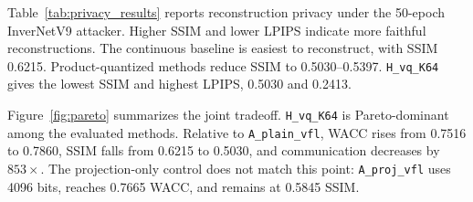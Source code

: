 \documentclass{article}
\begin{document}
Table~\ref{tab:privacy_results} reports reconstruction privacy under the 50-epoch InverNetV9 attacker. Higher SSIM and lower LPIPS indicate more faithful reconstructions. The continuous baseline is easiest to reconstruct, with SSIM 0.6215. Product-quantized methods reduce SSIM to 0.5030--0.5397. \texttt{H\_vq\_K64} gives the lowest SSIM and highest LPIPS, 0.5030 and 0.2413.

\begin{table}[t]
\caption{Reconstruction privacy results under InverNetV9. SSIM and LPIPS are averaged over two seeds and all 5,067 validation samples per seed. Lower SSIM and higher LPIPS indicate weaker reconstruction.}
\label{tab:privacy_results}
\centering
\scriptsize
\setlength{\tabcolsep}{3pt}
\end{table}

Figure~\ref{fig:pareto} summarizes the joint tradeoff. \texttt{H\_vq\_K64} is Pareto-dominant among the evaluated methods. Relative to \texttt{A\_plain\_vfl}, WACC rises from 0.7516 to 0.7860, SSIM falls from 0.6215 to 0.5030, and communication decreases by $853\times$. The projection-only control does not match this point: \texttt{A\_proj\_vfl} uses 4096 bits, reaches 0.7665 WACC, and remains at 0.5845 SSIM.
\end{document}
